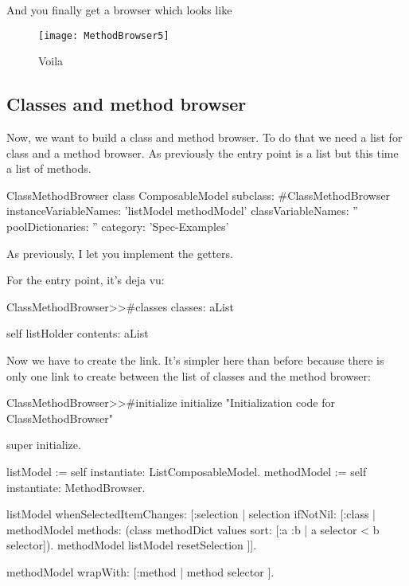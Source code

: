 \documentclass[a4paper,10pt,twoside]{book}
\begin{document}
And you finally get a browser which looks like 
\begin{figure}[ht]
\begin{center}
	\texttt{[image: MethodBrowser5]}
	\caption{Voila}
\end{center}
\end{figure}

\subsection{Classes and method browser}

Now, we want to build a class and method browser. To do that we need a list for class and a method browser. As previously the entry point is a list but this time a list of methods.

\begin{classdef}{ClassMethodBrowser class}
ComposableModel subclass: #ClassMethodBrowser
	instanceVariableNames: 'listModel methodModel'
	classVariableNames: ''
	poolDictionaries: ''
	category: 'Spec-Examples'
\end{classdef}

As previously, I let you implement the getters.

For the entry point, it's deja vu: 
\begin{method}{ClassMethodBrowser>>\#classes}
classes: aList

	self listHolder contents: aList
\end{method}

Now we have to create the link. It's simpler here than before because there is only one link to create between the list of classes and the method browser:

\begin{method}{ClassMethodBrowser>>\#initialize}
initialize
	"Initialization code for ClassMethodBrowser"

	super initialize.

	listModel := self instantiate: ListComposableModel.
	methodModel := self instantiate: MethodBrowser.
	
	listModel whenSelectedItemChanges: [:selection |
		selection 
			ifNotNil: [:class | 
				methodModel methods: (class methodDict values sort: [:a :b | a selector < b selector]).
				methodModel listModel resetSelection ]].
	
	methodModel wrapWith: [:method | method selector ].
\end{method}
\end{document}
